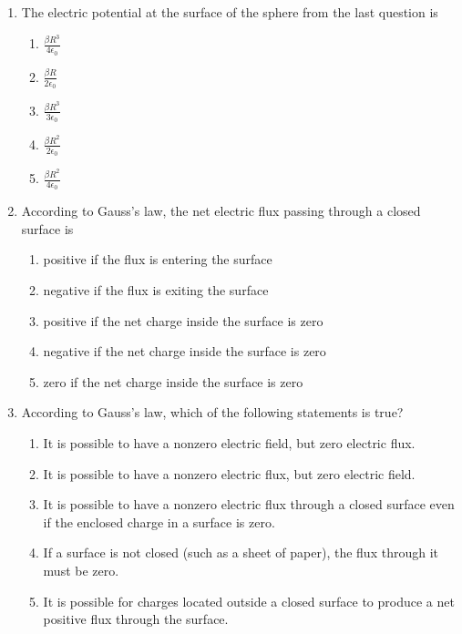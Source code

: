 \documentclass[11pt]{article}
\begin{document}
\begin{multicols}{2}
\begin{enumerate}[leftmargin=18pt]
  \item The electric potential at the surface of the sphere from the last
    question is
    \begin{enumerate}[noitemsep,topsep=0pt,leftmargin=18pt,label=(\Alph*)]
    \item $\displaystyle\frac{\beta R^3}{4\epsilon_0}$
    \item $\displaystyle\frac{\beta R}{2\epsilon_0}$
    \item $\displaystyle\frac{\beta R^3}{3\epsilon_0}$
    \item $\displaystyle\frac{\beta R^2}{2\epsilon_0}$
    \item $\displaystyle\frac{\beta R^2}{4\epsilon_0}$
    \end{enumerate}
  \item According to Gauss's law, the net electric flux passing through a closed
    surface is
    \begin{enumerate}[noitemsep,topsep=0pt,leftmargin=18pt,label=(\Alph*)]
    \item positive if the flux is entering the surface
    \item negative if the flux is exiting the surface
    \item positive if the net charge inside the surface is zero
    \item negative if the net charge inside the surface is zero
    \item zero if the net charge inside the surface is zero
    \end{enumerate}

  \item According to Gauss's law, which of the following statements is true?
    \begin{enumerate}[noitemsep,topsep=0pt,leftmargin=18pt,label=(\Alph*)]
    \item It is possible to have a nonzero electric field, but zero electric
      flux.
    \item It is possible to have a nonzero electric flux, but zero electric
      field.
    \item It is possible to have a nonzero electric flux through a closed
      surface even if the enclosed charge in a surface is zero.
    \item If a surface is not closed (such as a sheet of paper), the flux
      through it must be zero.
    \item It is possible for charges located outside a closed surface to produce
      a net positive flux through the surface.
    \end{enumerate}
    

\end{enumerate}
\end{multicols}
\end{document}

